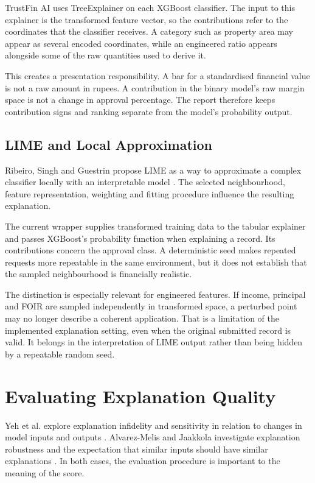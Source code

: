 TrustFin AI uses TreeExplainer on each XGBoost classifier. The input to this explainer is the transformed feature vector, so the contributions refer to the coordinates that the classifier receives. A category such as property area may appear as several encoded coordinates, while an engineered ratio appears alongside some of the raw quantities used to derive it.

This creates a presentation responsibility. A bar for a standardised financial value is not a raw amount in rupees. A contribution in the binary model's raw margin space is not a change in approval percentage. The report therefore keeps contribution signs and ranking separate from the model's probability output.

\subsection{LIME and Local Approximation}
Ribeiro, Singh and Guestrin propose LIME as a way to approximate a complex classifier locally with an interpretable model \cite{ribeiro2016}. The selected neighbourhood, feature representation, weighting and fitting procedure influence the resulting explanation.

The current wrapper supplies transformed training data to the tabular explainer and passes XGBoost's probability function when explaining a record. Its contributions concern the approval class. A deterministic seed makes repeated requests more repeatable in the same environment, but it does not establish that the sampled neighbourhood is financially realistic.

The distinction is especially relevant for engineered features. If income, principal and FOIR are sampled independently in transformed space, a perturbed point may no longer describe a coherent application. That is a limitation of the implemented explanation setting, even when the original submitted record is valid. It belongs in the interpretation of LIME output rather than being hidden by a repeatable random seed.

\section{Evaluating Explanation Quality}
Yeh et al. explore explanation infidelity and sensitivity in relation to changes in model inputs and outputs \cite{yeh2019}. Alvarez-Melis and Jaakkola investigate explanation robustness and the expectation that similar inputs should have similar explanations \cite{alvarezm2018}. In both cases, the evaluation procedure is important to the meaning of the score.

